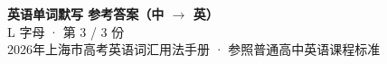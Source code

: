 \documentclass[10pt,a4paper]{article}
\begin{document}
\pagestyle{plain}

\begin{center}
{\LARGE\bfseries 英语单词默写 \quad 参考答案（中 $\to$ 英）}\\[0.22em]
{\large L 字母 · 第 3 / 3 份}\\[0.18em]
{\small 2026年上海市高考英语词汇用法手册 · 参照普通高中英语课程标准}
\end{center}

\vspace{0.2em}
\noindent{\color{rulegray}\rule{\textwidth}{0.8pt}}

\vspace{0.35em}

\vspace{0.25em}
\renewcommand{\arraystretch}{1.32}
\end{document}
